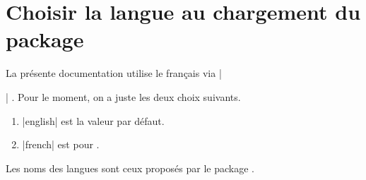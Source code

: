 \documentclass[10pt, a4paper]{article}
\begin{document}
\section{Choisir la langue au chargement du package}

La présente documentation utilise le français via \tdocinlatex|\usepackage[lang = french]{tutodoc}| .
Pour le moment, on a juste les deux choix suivants.

\begin{enumerate}
    \item \tdocinlatex|english| est la valeur par défaut.

    \item \tdocinlatex|french| est pour .
\end{enumerate}


\begin{tdocnote}
	Les noms des langues sont ceux proposés par le package .
\end{tdocnote}
\end{document}
